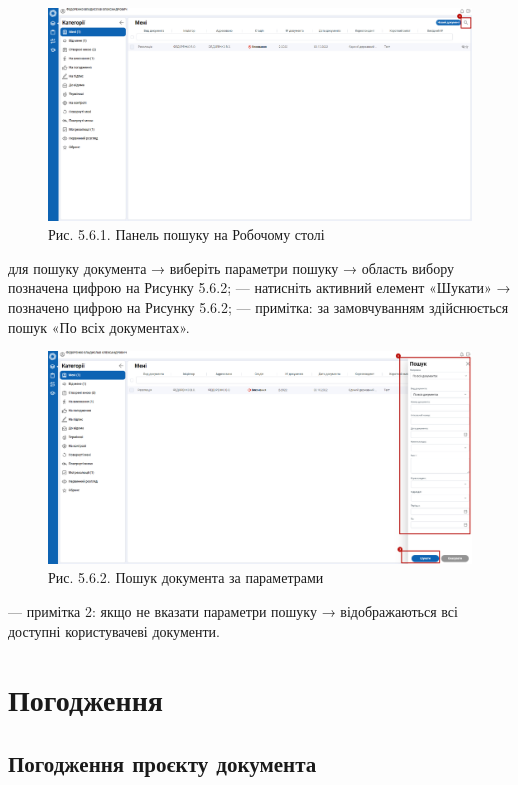 \begin{figure}[!htbp]
\centerline{\includegraphics[width=\textwidth]{img/5.6.1.png}}
\caption{Рис. 5.6.1. Панель пошуку на Робочому столі}
\end{figure}

для пошуку документа → виберіть параметри пошуку → область вибору позначена цифрою  на Рисунку 5.6.2;
--- натисніть активний елемент «Шукати» → позначено цифрою  на Рисунку 5.6.2;
--- примітка: за замовчуванням здійснюється пошук «По всіх документах».

\begin{figure}[!htbp]
\centerline{\includegraphics[width=\textwidth]{img/5.6.2.png}}
\caption{Рис. 5.6.2. Пошук документа за параметрами}
\end{figure}

--- примітка 2: якщо не вказати параметри пошуку → відображаються всі
доступні користувачеві документи. 

\newpage
\section{Погодження}

\subsection{Погодження проєкту документа}


